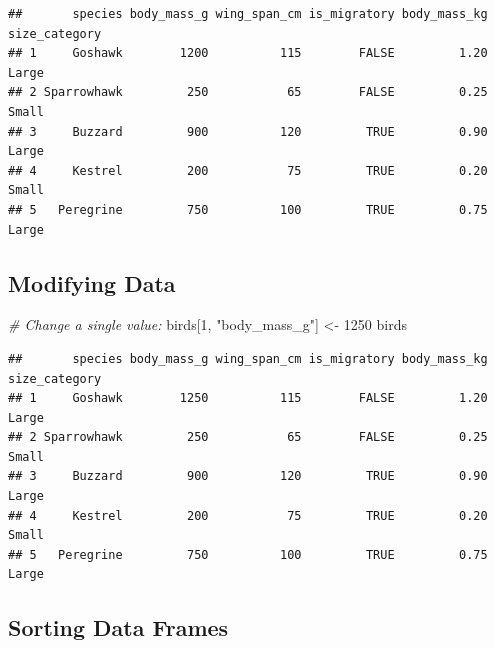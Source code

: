 \documentclass[
]{article}
\newenvironment{Shaded}{\begin{snugshade}}{\end{snugshade}}
\newcommand{\CommentTok}[1]{\textcolor[rgb]{0.56,0.35,0.01}{\textit{#1}}}
\newcommand{\DecValTok}[1]{\textcolor[rgb]{0.00,0.00,0.81}{#1}}
\newcommand{\NormalTok}[1]{#1}
\newcommand{\OtherTok}[1]{\textcolor[rgb]{0.56,0.35,0.01}{#1}}
\newcommand{\SpecialCharTok}[1]{\textcolor[rgb]{0.81,0.36,0.00}{\textbf{#1}}}
\newcommand{\StringTok}[1]{\textcolor[rgb]{0.31,0.60,0.02}{#1}}
\begin{document}
\begin{verbatim}
##       species body_mass_g wing_span_cm is_migratory body_mass_kg size_category
## 1     Goshawk        1200          115        FALSE         1.20         Large
## 2 Sparrowhawk         250           65        FALSE         0.25         Small
## 3     Buzzard         900          120         TRUE         0.90         Large
## 4     Kestrel         200           75         TRUE         0.20         Small
## 5   Peregrine         750          100         TRUE         0.75         Large
\end{verbatim}

\subsection{Modifying Data}\label{modifying-data}

\begin{Shaded}
\begin{Highlighting}[]
\CommentTok{\# Change a single value:}
\NormalTok{birds[}\DecValTok{1}\NormalTok{, }\StringTok{"body\_mass\_g"}\NormalTok{] }\OtherTok{\textless{}{-}} \DecValTok{1250}
\NormalTok{birds}
\end{Highlighting}
\end{Shaded}

\begin{verbatim}
##       species body_mass_g wing_span_cm is_migratory body_mass_kg size_category
## 1     Goshawk        1250          115        FALSE         1.20         Large
## 2 Sparrowhawk         250           65        FALSE         0.25         Small
## 3     Buzzard         900          120         TRUE         0.90         Large
## 4     Kestrel         200           75         TRUE         0.20         Small
## 5   Peregrine         750          100         TRUE         0.75         Large
\end{verbatim}

\begin{Shaded}
\end{Shaded}

\subsection{Sorting Data Frames}\label{sorting-data-frames}
\end{document}
